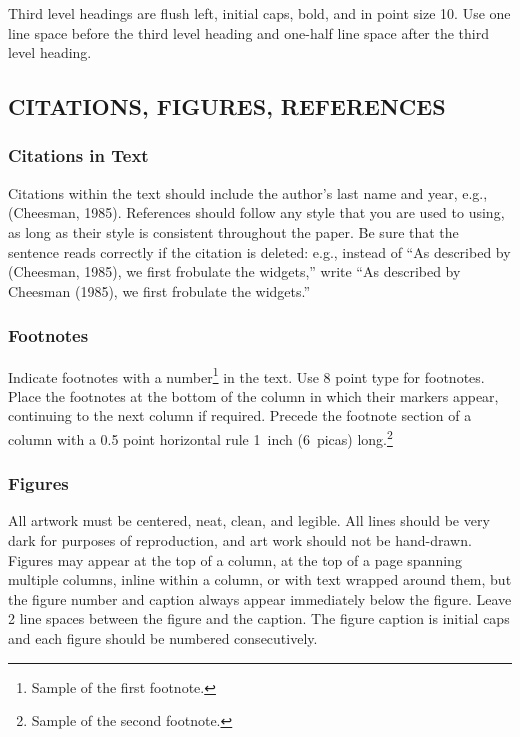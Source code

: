 \documentclass[twoside]{article}
\begin{document}
Third level headings are flush left, initial caps, bold, and in point
size 10. Use one line space before the third level heading and one-half line
space after the third level heading.

\subsection{CITATIONS, FIGURES, REFERENCES}


\subsubsection{Citations in Text}

Citations within the text should include the author's last name and
year, e.g., (Cheesman, 1985). References should follow any style that
you are used to using, as long as their style is consistent throughout
the paper.  Be sure that the sentence reads correctly if the citation
is deleted: e.g., instead of ``As described by (Cheesman, 1985), we
first frobulate the widgets,'' write ``As described by Cheesman
(1985), we first frobulate the widgets.''  %

\subsubsection{Footnotes}

Indicate footnotes with a number\footnote{Sample of the first
  footnote.} in the text. Use 8 point type for footnotes. Place the
footnotes at the bottom of the column in which their markers appear,
continuing to the next column if required. Precede the footnote
section of a column with a 0.5 point horizontal rule 1~inch (6~picas)
long.\footnote{Sample of the second footnote.}

\subsubsection{Figures}

All artwork must be centered, neat, clean, and legible.  All lines
should be very dark for purposes of reproduction, and art work should
not be hand-drawn.  Figures may appear at the top of a column, at the
top of a page spanning multiple columns, inline within a column, or
with text wrapped around them, but the figure number and caption
always appear immediately below the figure.  Leave 2 line spaces
between the figure and the caption. The figure caption is initial caps
and each figure should be numbered consecutively.
\end{document}
